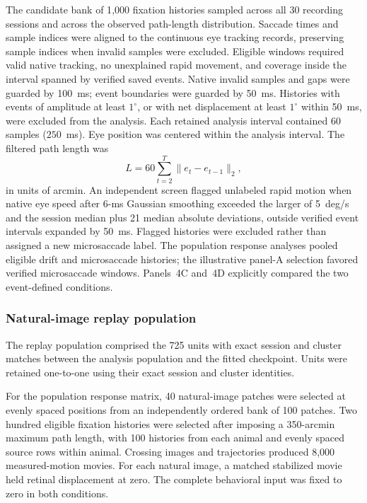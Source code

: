 \documentclass{lite}
\begin{document}
The candidate bank of 1{,}000 fixation histories sampled across all 30 recording sessions and across the observed path-length distribution. Saccade times and sample indices were aligned to the continuous eye tracking records, preserving sample indices when invalid samples were excluded. Eligible windows required valid native tracking, no unexplained rapid movement, and coverage inside the interval spanned by verified saved events. Native invalid samples and gaps were guarded by 100~ms; event boundaries were guarded by 50~ms. Histories with events of amplitude at least $1^\circ$, or with net displacement at least $1^\circ$ within 50~ms, were excluded from the analysis. Each retained analysis interval contained 60 samples ($250$~ms). Eye position was centered within the analysis interval. The filtered path length was
\begin{equation}
L = 60\sum_{t=2}^{T}\lVert e_t-e_{t-1}\rVert_2,
\end{equation}
in units of arcmin. An independent screen flagged unlabeled rapid motion when native eye speed after 6-ms Gaussian smoothing exceeded the larger of 5~deg/s and the session median plus 21 median absolute deviations, outside verified event intervals expanded by 50~ms. Flagged histories were excluded rather than assigned a new microsaccade label. The population response analyses pooled eligible drift and microsaccade histories; the illustrative panel-A selection favored verified microsaccade windows. Panels~4C and~4D explicitly compared the two event-defined conditions.

\subsubsection{Natural-image replay population}

The replay population comprised the 725 units with exact session and cluster matches between the analysis population and the fitted checkpoint. Units were retained one-to-one using their exact session and cluster identities.

For the population response matrix, 40 natural-image patches were selected at evenly spaced positions from an independently ordered bank of 100 patches. Two hundred eligible fixation histories were selected after imposing a 350-arcmin maximum path length, with 100 histories from each animal and evenly spaced source rows within animal. Crossing images and trajectories produced 8{,}000 measured-motion movies. For each natural image, a matched stabilized movie held retinal displacement at zero. The complete behavioral input was fixed to zero in both conditions.
\end{document}
